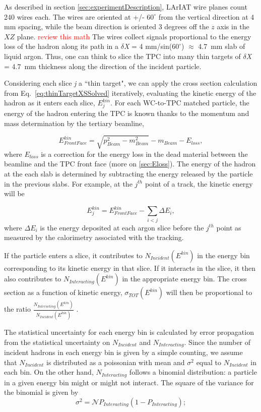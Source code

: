 As described in section \ref{sec:experimentDescription}, LArIAT wire planes count 240 wires each. The wires are oriented at +/- $60^{\circ}$ from the vertical direction at 4 mm spacing, while the beam direction is oriented 3 degrees off the $z$ axis in the $XZ$ plane. \textcolor{red}{review this math} The wires collect signals proportional to the energy loss of the hadron along its path in a  $\delta${\emph{X}} = 4 mm/sin($60^{\circ}$) $\approx$ 4.7~mm slab of liquid argon. Thus, one can think to slice the TPC into many thin targets of $\delta${\emph{X}} = 4.7~mm thickness along the direction of the incident particle. 

Considering each slice {\emph{j}}  a ``thin target",  we can apply the cross section calculation from Eq.~\ref{eq:thinTargetXSSolved} iteratively, evaluating the kinetic energy of the hadron as it enters each slice, $E_{j}^{kin}$.  For each WC-to-TPC matched particle, the energy of the hadron entering the TPC is known thanks to the momentum and mass determination by the tertiary beamline, 

\begin{equation}
 E^{kin}_{Front Face}  = \sqrt{p^2_{Beam} - m^2_{Beam}} - m_{Beam} - E_{loss},
\label{eq:enFF}
\end{equation}
where $E_{loss}$ is a correction for the energy loss in the dead material between the beamline and the TPC front face (more on \ref{sec:Eloss}). The  energy of the hadron at the each slab is determined by subtracting the energy released by the particle in the previous slabs. For example, at the $j^{th}$ point of a track, the kinetic energy will be

\begin{equation}
 E_{j}^{kin} =  E^{kin}_{Front Face} - \sum_{i < j} \Delta E_i,
\label{eq:KEj}
\end{equation}
where $\Delta E_i$ is the energy deposited at each argon slice before the $j^{th}$ point as measured by the calorimetry associated with the tracking.


If the particle enters a slice, it contributes to $N_{Incident}( E^{kin})$ in the energy bin corresponding to its kinetic energy in that slice. If it interacts in the slice, it then also contributes to $N_{Interacting}(E^{kin})$ in the appropriate energy bin. The cross section as a function of kinetic energy, $\sigma_{TOT}( E^{kin})$ will then be proportional to the ratio $\frac{N_{Interacting}( E^{kin})}{N_{Incident}( E^{kin})}$ .


The statistical uncertainty for each energy bin is calculated by error propagation from the statistical  uncertainty on $N_{Incident}$ and $N_{Interacting}$. 
Since the number of incident hadrons in each energy bin is given by a simple counting, we assume that $N_{Incident}$ is distributed as a poissonian with mean and $\sigma^2$ equal to $N_{Incident}$ in each bin.  
On the other hand, $N_{Interacting}$ follows a binomial distribution: a particle in a given energy bin might or might not interact.  The square of the variance for the binomial is given by  
\begin{equation}
\sigma^2 = \mathcal{N}P_{Interacting}(1-P_{Interacting});
\label{eq:binVar}
\end{equation}

